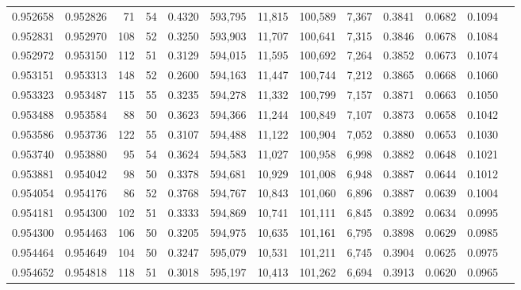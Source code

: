 \begin{tabular}{rrrrrrrrrrrrr}
0.952658 & 0.952826 &    71 &  54 &                                     0.4320 & 593,795 &  11,815 & 100,589 &   7,367 & 0.3841 & 0.0682 & 0.1094 \\
0.952831 & 0.952970 &   108 &  52 &                                     0.3250 & 593,903 &  11,707 & 100,641 &   7,315 & 0.3846 & 0.0678 & 0.1084 \\
0.952972 & 0.953150 &   112 &  51 &                                     0.3129 & 594,015 &  11,595 & 100,692 &   7,264 & 0.3852 & 0.0673 & 0.1074 \\
0.953151 & 0.953313 &   148 &  52 &                                     0.2600 & 594,163 &  11,447 & 100,744 &   7,212 & 0.3865 & 0.0668 & 0.1060 \\
0.953323 & 0.953487 &   115 &  55 &                                     0.3235 & 594,278 &  11,332 & 100,799 &   7,157 & 0.3871 & 0.0663 & 0.1050 \\
0.953488 & 0.953584 &    88 &  50 &                                     0.3623 & 594,366 &  11,244 & 100,849 &   7,107 & 0.3873 & 0.0658 & 0.1042 \\
0.953586 & 0.953736 &   122 &  55 &                                     0.3107 & 594,488 &  11,122 & 100,904 &   7,052 & 0.3880 & 0.0653 & 0.1030 \\
0.953740 & 0.953880 &    95 &  54 &                                     0.3624 & 594,583 &  11,027 & 100,958 &   6,998 & 0.3882 & 0.0648 & 0.1021 \\
0.953881 & 0.954042 &    98 &  50 &                                     0.3378 & 594,681 &  10,929 & 101,008 &   6,948 & 0.3887 & 0.0644 & 0.1012 \\
0.954054 & 0.954176 &    86 &  52 &                                     0.3768 & 594,767 &  10,843 & 101,060 &   6,896 & 0.3887 & 0.0639 & 0.1004 \\
0.954181 & 0.954300 &   102 &  51 &                                     0.3333 & 594,869 &  10,741 & 101,111 &   6,845 & 0.3892 & 0.0634 & 0.0995 \\
0.954300 & 0.954463 &   106 &  50 &                                     0.3205 & 594,975 &  10,635 & 101,161 &   6,795 & 0.3898 & 0.0629 & 0.0985 \\
0.954464 & 0.954649 &   104 &  50 &                                     0.3247 & 595,079 &  10,531 & 101,211 &   6,745 & 0.3904 & 0.0625 & 0.0975 \\
0.954652 & 0.954818 &   118 &  51 &                                     0.3018 & 595,197 &  10,413 & 101,262 &   6,694 & 0.3913 & 0.0620 & 0.0965 \\

\end{tabular}
